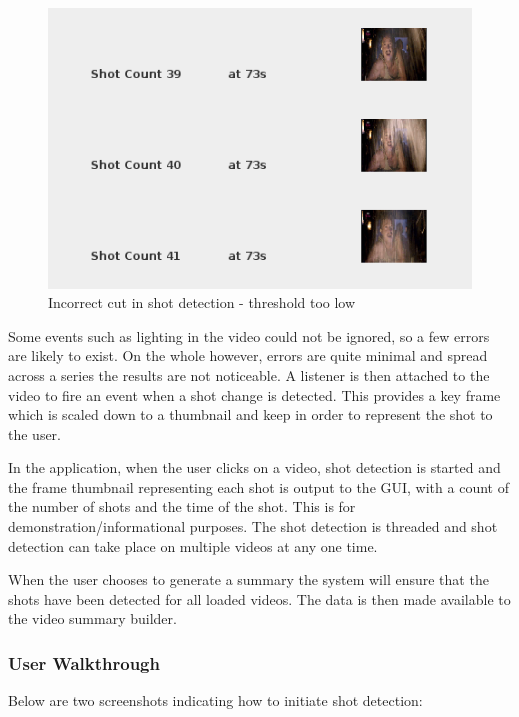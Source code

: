 \begin{figure}[h1]
\begin{center}
 \includegraphics[trim = 0mm 0mm 0mm 0mm, clip,
 scale=1.2]{Images/shot-detection-incorrect-cut.png}
  \caption{Incorrect cut in shot detection  - threshold too low}\label{fig:incorrectCutShotDetection}
 \end{center}
\end{figure}

Some events such as lighting in the video could not be ignored, so a few errors are likely to
exist. On the whole however, errors are quite minimal and spread across a series the results
are not noticeable. A listener is then attached to the video to fire an event when a
shot change is detected. This provides a key frame which is scaled down to a thumbnail
and keep in order to represent the shot to the user.

In the application, when the user clicks on a video, shot detection is started and the frame
thumbnail representing each shot is output to the GUI, with a count of the number of
shots and the time of the shot. This is for demonstration/informational purposes. 
The shot detection is threaded and shot detection can take place on multiple
videos at any one time.

When the user chooses to generate a summary the system will ensure that the shots have
been detected for all loaded videos. The data is then made available to the video summary
builder.

\newpage 
\subsubsection{User Walkthrough}
Below are two screenshots indicating how to initiate shot detection:

